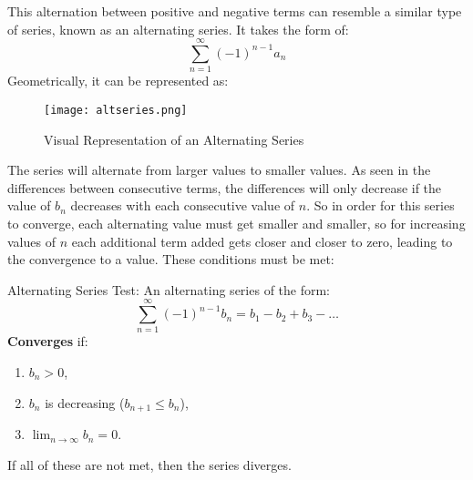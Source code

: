 \documentclass[a4paper, 11pt]{article}
\newenvironment{concept}{%
    \vspace{1em}
    \begin{tcolorbox}[colframe=black!70, colback=white!95, title=Definition]
}{%
    \end{tcolorbox}
    \vspace{1em}
}
\begin{document}
This alternation between positive and negative terms can resemble a similar type of series, known as an alternating series. It takes the form of: 
\[\sum_{n=1}^\infty (-1)^{n-1} a_n \]
Geometrically, it can be represented as: 
\begin{figure}[H]
    \caption{Visual Representation of an Alternating Series}
    \centering
    \texttt{[image: altseries.png]}
\end{figure}
The series will alternate from larger values to smaller values. As seen in the differences between consecutive terms, the differences will only decrease if the value of $b_n$ decreases with each consecutive value of $n$. So in order for this series to converge, each alternating value must get smaller and smaller, so for increasing values of $n$ each additional term added gets closer and closer to zero, leading to the convergence to a value. These conditions must be met: 
\begin{concept}{Alternating Series Test:}
    An alternating series of the form:
\[
\sum_{n=1}^\infty (-1)^{n-1} b_n = b_1 - b_2 + b_3 - \dots
\]
\textbf{Converges} if:
\begin{enumerate}
    \item \( b_n > 0 \),
    \item \( b_n \) is decreasing (\( b_{n+1} \leq b_n \)),
    \item \( \lim_{n \to \infty} b_n = 0 \).
\end{enumerate}
If all of these are not met, then the series diverges.
\end{concept}
\end{document}
